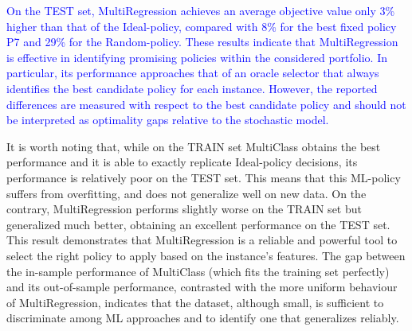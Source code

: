 \documentclass[authoryear,preprint,12pt]{elsarticle}
\newcommand{\rev}[1]{\textcolor{blue}{{#1}}}
\begin{document}
\rev{On the TEST set, MultiRegression achieves an average objective value only 3\% higher than that of the Ideal-policy, compared with 8\% for the best fixed policy P7 and 29\% for the Random-policy. These results indicate that MultiRegression is effective in identifying promising policies within the considered portfolio. In particular, its performance approaches that of an oracle selector that always identifies the best candidate policy for each instance. However, the reported differences are measured with respect to the best candidate policy and should not be interpreted as optimality gaps relative to the stochastic model.}



It is worth noting that, while on the TRAIN set MultiClass obtains the best performance and it is able to exactly replicate Ideal-policy decisions, its performance is relatively poor on the TEST set. This means that this ML-policy suffers from overfitting, and does not generalize well on new data. On the contrary, MultiRegression performs slightly worse on the TRAIN set but generalized much better, obtaining an excellent performance on the TEST set. This result demonstrates that MultiRegression is a reliable and powerful tool to select 
the right policy to apply based on the instance's features. The gap between the in-sample performance of MultiClass (which fits the training set perfectly) and its out-of-sample performance, contrasted with the more uniform behaviour of MultiRegression, indicates that the dataset, although small, is sufficient to discriminate among ML approaches and to identify one that generalizes reliably.
\end{document}
